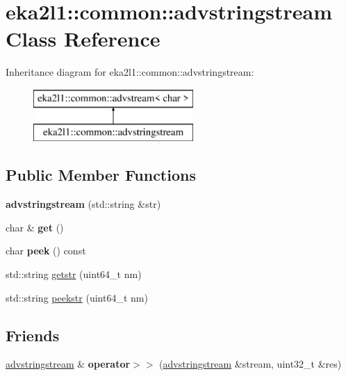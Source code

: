 \hypertarget{classeka2l1_1_1common_1_1advstringstream}{}\section{eka2l1\+:\+:common\+:\+:advstringstream Class Reference}
\label{classeka2l1_1_1common_1_1advstringstream}
Inheritance diagram for eka2l1\+:\+:common\+:\+:advstringstream\+:\begin{figure}[H]
\begin{center}
\leavevmode
\includegraphics[height=2.000000cm]{classeka2l1_1_1common_1_1advstringstream}
\end{center}
\end{figure}
\subsection*{Public Member Functions}
\begin{DoxyCompactItemize}
\item 
\mbox{\label{classeka2l1_1_1common_1_1advstringstream_aebb5194806ff5162d5caef9d2b320eea}} 
{\bfseries advstringstream} (std\+::string \&str)
\item 
\mbox{\label{classeka2l1_1_1common_1_1advstringstream_ae7ab99648097de71816b7ae26be7aa36}} 
char \& {\bfseries get} ()
\item 
\mbox{\label{classeka2l1_1_1common_1_1advstringstream_a06751f6fcafd8a1054184109b6c1caf5}} 
char {\bfseries peek} () const
\item 
std\+::string \mbox{\hyperlink{classeka2l1_1_1common_1_1advstringstream_af07742f27d9343fb4c88946a4e408727}{getstr}} (uint64\+\_\+t nm)
\item 
std\+::string \mbox{\hyperlink{classeka2l1_1_1common_1_1advstringstream_a95581d4a188ebfcb50df49d43a62d650}{peekstr}} (uint64\+\_\+t nm)
\end{DoxyCompactItemize}
\subsection*{Friends}
\begin{DoxyCompactItemize}
\item 
\mbox{\label{classeka2l1_1_1common_1_1advstringstream_a3dd0eb02c7d07eca539b688b8c4184dd}} 
\mbox{\hyperlink{classeka2l1_1_1common_1_1advstringstream}{advstringstream}} \& {\bfseries operator$>$$>$} (\mbox{\hyperlink{classeka2l1_1_1common_1_1advstringstream}{advstringstream}} \&stream, uint32\+\_\+t \&res)
\end{DoxyCompactItemize}
